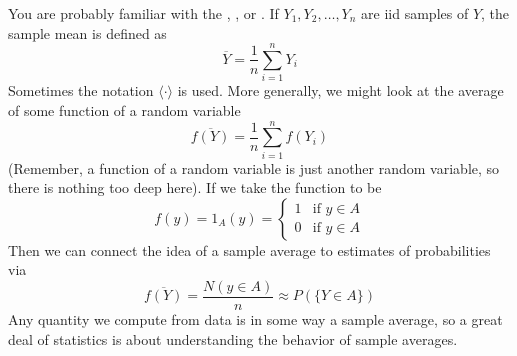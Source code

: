  You are probably familiar with the , , or . 
If $Y_1,Y_2,\dots,Y_n$ are iid samples of $Y$, the sample mean is defined as
\begin{equation*}
\overline{Y} = \frac{1}{n}\sum_{i=1}^nY_i
\end{equation*}
Sometimes the notation $\langle \cdot \rangle$ is used. 
More generally, we might look at the average of some function of a random variable 
\begin{equation*}
\overline{f(Y)} = \frac{1}{n}\sum_{i=1}^nf(Y_i)
\end{equation*}
(Remember, a function of a random variable is just another random variable, so there is nothing too deep here). 
If we take the function to be 
\begin{equation}
f(y) =1_A(y) =  \left\{\begin{array}{lr} 
1 & \text{if }y \in A\\
0 & \text{if }y \in A
\end{array}\right.
\end{equation}
Then we can connect the idea of a sample average to estimates of probabilities via
\begin{equation}
\overline{f(Y)} = \frac{N(y \in A)}{n} \approx P(\{Y \in A\})
\end{equation}
Any quantity we compute from data is in some way a sample average, so a great deal of statistics is about understanding the behavior of sample averages. 

